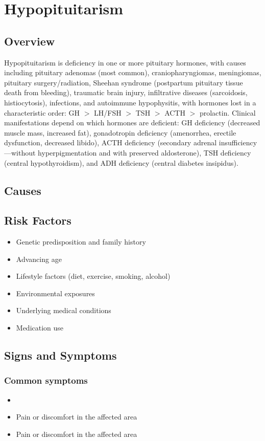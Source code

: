 \chapter{Hypopituitarism}
\label{sec:Hypopituitarism}

\section{Overview}
Hypopituitarism is deficiency in one or more pituitary hormones, with causes including pituitary adenomas (most common), craniopharyngiomas, meningiomas, pituitary surgery/radiation, Sheehan syndrome (postpartum pituitary tissue death from bleeding), traumatic brain injury, infiltrative diseases (sarcoidosis, histiocytosis), infections, and autoimmune hypophysitis, with hormones lost in a characteristic order: GH $>$ LH/FSH $>$ TSH $>$ ACTH $>$ prolactin. Clinical manifestations depend on which hormones are deficient: GH deficiency (decreased muscle mass, increased fat), gonadotropin deficiency (amenorrhea, erectile dysfunction, decreased libido), ACTH deficiency (secondary adrenal insufficiency---without hyperpigmentation and with preserved aldosterone), TSH deficiency (central hypothyroidism), and ADH deficiency (central diabetes insipidus).
\section{Causes}
\section{Risk Factors}

\begin{itemize}[noitemsep]
  \item Genetic predisposition and family history
  \item Advancing age
  \item Lifestyle factors (diet, exercise, smoking, alcohol)
  \item Environmental exposures
  \item Underlying medical conditions
  \item Medication use
\end{itemize}
\section{Signs and Symptoms}

\subsection{Common symptoms}
\begin{itemize}[noitemsep]
  \item \item Pain or discomfort in the affected area    \item Pain or discomfort in the affected area
  \end{itemize}

